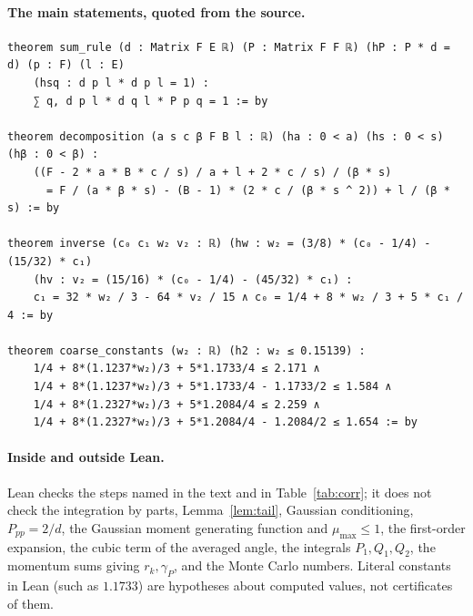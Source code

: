 \documentclass[11pt,a4paper]{article}
\theoremstyle{definition}
\theoremstyle{remark}
\begin{document}
\paragraph{The main statements, quoted from the source.}
\begingroup\scriptsize
\begin{verbatim}
theorem sum_rule (d : Matrix F E ℝ) (P : Matrix F F ℝ) (hP : P * d = d) (p : F) (l : E)
    (hsq : d p l * d p l = 1) :
    ∑ q, d p l * d q l * P p q = 1 := by

theorem decomposition (a s c β F B l : ℝ) (ha : 0 < a) (hs : 0 < s) (hβ : 0 < β) :
    ((F - 2 * a * B * c / s) / a + l + 2 * c / s) / (β * s)
      = F / (a * β * s) - (B - 1) * (2 * c / (β * s ^ 2)) + l / (β * s) := by

theorem inverse (c₀ c₁ w₂ v₂ : ℝ) (hw : w₂ = (3/8) * (c₀ - 1/4) - (15/32) * c₁)
    (hv : v₂ = (15/16) * (c₀ - 1/4) - (45/32) * c₁) :
    c₁ = 32 * w₂ / 3 - 64 * v₂ / 15 ∧ c₀ = 1/4 + 8 * w₂ / 3 + 5 * c₁ / 4 := by

theorem coarse_constants (w₂ : ℝ) (h2 : w₂ ≤ 0.15139) :
    1/4 + 8*(1.1237*w₂)/3 + 5*1.1733/4 ≤ 2.171 ∧
    1/4 + 8*(1.1237*w₂)/3 + 5*1.1733/4 - 1.1733/2 ≤ 1.584 ∧
    1/4 + 8*(1.2327*w₂)/3 + 5*1.2084/4 ≤ 2.259 ∧
    1/4 + 8*(1.2327*w₂)/3 + 5*1.2084/4 - 1.2084/2 ≤ 1.654 := by
\end{verbatim}
\endgroup

\paragraph{Inside and outside Lean.} Lean checks the steps named in the text and in Table~\ref{tab:corr}; it does not check the integration by parts, Lemma~\ref{lem:tail}, Gaussian conditioning, $P_{pp}=2/d$, the Gaussian moment generating function and $\mu_{\max}\le1$, the first-order expansion, the cubic term of the averaged angle, the integrals $P_1,Q_1,Q_2$, the momentum sums giving $r_k,\gamma_P$, and the Monte Carlo numbers. Literal constants in Lean (such as $1.1733$) are hypotheses about computed values, not certificates of them.
\end{document}

